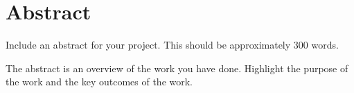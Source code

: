 \thispagestyle{empty}

\section*{\centering Abstract}

Include an abstract for your project. This should be approximately 300 words. 

The abstract is an overview of the work you have done. Highlight the purpose of the work and the key outcomes of the work.

